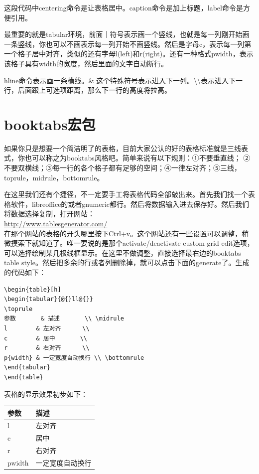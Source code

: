 \documentclass[11pt,oneside]{book}
\begin{document}
这段代码中centering命令是让表格居中。caption命令是加上标题，label命令是方便引用。

最重要的就是tabular环境，前面｜符号表示画一个竖线，也就是每一列刚开始画一条竖线，你也可以不画表示每一列开始不画竖线。然后是字母c，表示每一列第一个格子居中对齐，类似的还有字母l(left)和r(right)。还有一种格式p{width}，表示该格子具有width的宽度，然后里面的文字自动断行。

hline命令表示画一条横线。\& 这个特殊符号表示进入下一列。\textbackslash \textbackslash 表示进入下一行，后面跟上可选项距离，那么下一行的高度将拉高。


\section{booktabs宏包}
如果你只是想要一个简洁明了的表格，目前大家公认的好的表格标准就是三线表式，你也可以称之为booktabs风格吧。简单来说有以下规则：①不要垂直线； ②不要双横线；③每一行的各个格子都有足够的空间；④一律左对齐；⑤三线，toprule，midrule，bottomrule。

在这里我们还有个捷径，不一定要手工将表格代码全部敲出来。首先我们找一个表格软件，libreoffice的或者gnumeric都行。然后将数据输入进去保存好。然后我们将数据选择复制，打开网站：\\ \href{http://www.tablesgenerator.com/}{http://www.tablesgenerator.com/}\\在那个网站的表格的开头哪里按下Ctrl+v。这个网站还有一些设置可以调整，稍微摸索下就知道了。唯一要说的是那个activate/deactivate custom grid edit选项，可以选择绘制某几根线框显示。在这里不做调整，直接选择最右边的booktabs table style。然后把多余的行或者列删除掉，就可以点击下面的generate了。生成的代码如下：
\begin{Verbatim}
\begin{table}[h]
\begin{tabular}{@{}ll@{}}
\toprule
参数       & 描述       \\ \midrule
l        & 左对齐      \\
c        & 居中       \\
r        & 右对齐      \\
p{width} & 一定宽度自动换行 \\ \bottomrule
\end{tabular}
\end{table}
\end{Verbatim}
表格的显示效果初步如下：
\begin{table}[H]
\begin{tabular}{@{}ll@{}}
\toprule
参数       & 描述       \\ \midrule
l        & 左对齐      \\
c        & 居中       \\
r        & 右对齐      \\
p{width} & 一定宽度自动换行 \\ \bottomrule
\end{tabular}
\end{table}
\end{document}
